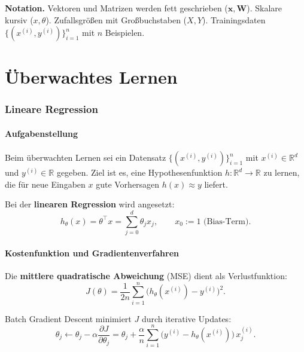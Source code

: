 \documentclass[11pt]{article}
\theoremstyle{csthm}
\theoremstyle{csdef}
\newcommand{\R}{\mathbb{R}}
\newcommand{\htheta}{h_\theta}
\newcommand{\T}{^\top}
\begin{document}
\noindent\textbf{Notation.} Vektoren und Matrizen werden fett geschrieben
($\bm{x}, \bm{W}$). Skalare kursiv ($x, \theta$). Zufallsgrößen mit
Großbuchstaben ($X, Y$). Trainingsdaten $\{(x^{(i)}, y^{(i)})\}_{i=1}^n$ mit
$n$ Beispielen.

\newpage

\part{Überwachtes Lernen}

\section{Lineare Regression}

\subsection{Aufgabenstellung}

Beim überwachten Lernen sei ein Datensatz
$\{(x^{(i)}, y^{(i)})\}_{i=1}^n$ mit $x^{(i)} \in \R^d$ und
$y^{(i)} \in \R$ gegeben. Ziel ist es, eine Hypothesenfunktion
$h : \R^d \to \R$ zu lernen, die für neue Eingaben $x$ gute
Vorhersagen $h(x) \approx y$ liefert.

Bei der \textbf{linearen Regression} wird angesetzt:
\begin{equation}
  \htheta(x) = \theta\T x = \sum_{j=0}^{d} \theta_j x_j,
  \qquad x_0 := 1 \text{ (Bias-Term).}
\end{equation}

\subsection{Kostenfunktion und Gradientenverfahren}

Die \textbf{mittlere quadratische Abweichung} (MSE) dient als Verlustfunktion:
\begin{equation}
  J(\theta) = \frac{1}{2n} \sum_{i=1}^{n}
    \bigl(\htheta(x^{(i)}) - y^{(i)}\bigr)^2.
\end{equation}

Batch Gradient Descent minimiert $J$ durch iterative Updates:
\begin{equation}
  \theta_j \leftarrow \theta_j
    - \alpha \frac{\partial J}{\partial \theta_j}
  = \theta_j + \frac{\alpha}{n}
    \sum_{i=1}^{n} \bigl(y^{(i)} - \htheta(x^{(i)})\bigr)\, x_j^{(i)}.
\end{equation}
\end{document}
